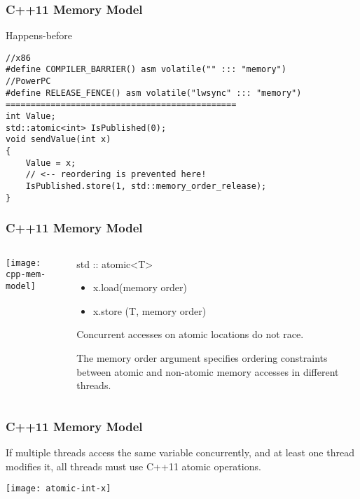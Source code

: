 \begin{frame}[fragile]
    \frametitle{C++11 Memory Model}
    \LARGE
    Happens-before
    \large    
    \begin{block}{}
        \begin{verbatim}
//x86
#define COMPILER_BARRIER() asm volatile("" ::: "memory") 
//PowerPC
#define RELEASE_FENCE() asm volatile("lwsync" ::: "memory") 
==============================================
int Value;
std::atomic<int> IsPublished(0);
void sendValue(int x)
{
    Value = x;
    // <-- reordering is prevented here!
    IsPublished.store(1, std::memory_order_release);
}
\end{verbatim}
    \end{block}
    
\end{frame}
\begin{frame}
    \frametitle{C++11 Memory Model}
    
    
    \begin{columns}
        
        \begin{column}{.4\textwidth}
            \texttt{[image: cpp-mem-model]}
        \end{column}
        \begin{column}{.6\textwidth}
            
            \Large
            std :: atomic<T>

            \begin{itemize}
                \item x.load(memory order)
                \item x.store (T, memory order)
                
            \end{itemize}
         \normalsize
        Concurrent accesses on atomic locations do not race.
        
        The memory order argument specifies ordering constraints between
        atomic and non-atomic memory accesses in different threads.
                    
        \end{column}
    \end{columns}
    
    \end{frame}


\begin{frame}
    \frametitle{C++11 Memory Model}
    \Large
    If multiple threads access the same variable concurrently, and at least one
    thread modifies it, all threads must use C++11 atomic operations.
    
    \centering
    \texttt{[image: atomic-int-x]}
\end{frame}

